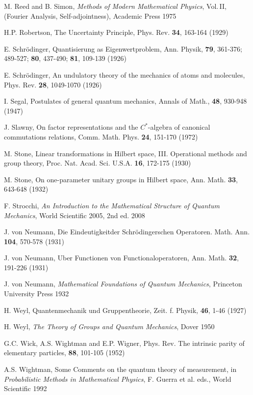 \documentclass[12pt]{article}
\begin{document}
M. Reed and B. Simon, {\em Methods of Modern Mathematical Physics}, Vol.\,II, (Fourier Analysis, Self-adjointness), Academic Press 1975

H.P. Robertson, The Uncertainty Principle, Phys. Rev. {\bf 34}, 163-164 (1929)

E. Schr\"odinger, Quantisierung as Eigenwertproblem, Ann. Physik, {\bf 79}, 361-376; 489-527; {\bf 80}, 437-490; {\bf 81}, 109-139 (1926)

E. Schr\"odinger, An undulatory theory of the mechanics of atoms and molecules, Phys. Rev. {\bf 28}, 1049-1070 (1926)

I. Segal, Postulates of general quantum mechanics, Annals of Math., {\bf 48}, 930-948 (1947)

J. Slawny, On factor representations and the $C^*$-algebra of canonical commutations relations, Comm. Math. Phys. {\bf 24}, 151-170 (1972)

M.  Stone, Linear transformations in Hilbert space, III. Operational methods and group theory, Proc. Nat. Acad. Sci. U.S.A. {\bf 16}, 172-175 (1930)
 
M. Stone, On one-parameter unitary groups in Hilbert space, Ann. Math. {\bf 33}, 643-648 (1932)

F. Strocchi, {\em An Introduction to the Mathematical Structure of Quantum Mechanics},  World Scientific 2005, 2nd ed. 2008

J. von Neumann, Die Eindeutigkeitder Schr\"{o}dingerschen Operatoren. Math. Ann. {\bf 104}, 570-578 (1931)

J. von Neumann, Uber Functionen von Functionaloperatoren, Ann. Math. {\bf 32}, 191-226 (1931)

J. von Neumann, {\em  Mathematical Foundations of Quantum Mechanics}, Princeton University Press 1932

H. Weyl, Quantenmechanik und Gruppentheorie, Zeit. f. Physik, {\bf 46}, 1-46 (1927)

H. Weyl, {\em The Theory of Groups and Quantum Mechanics}, Dover 1950

G.C. Wick, A.S. Wightman and E.P. Wigner, Phys. Rev. The intrinsic parity of elementary particles, {\bf 88}, 101-105  (1952) 

A.S. Wightman, Some Comments on the quantum theory of measurement, in {\em Probabilistic Methods in Mathematical Physics}, F. Guerra et al. eds., World Scientific 1992


\vspace{2mm}

 
\end{document}

